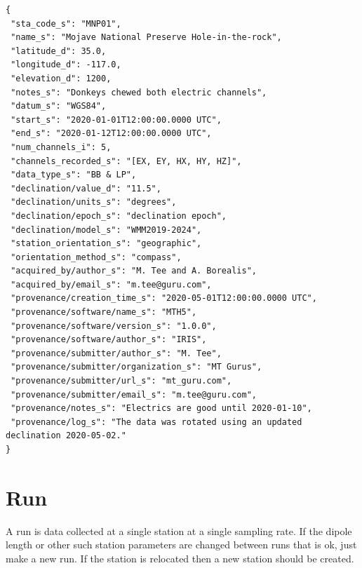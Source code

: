 \documentclass{article}
\begin{document}
\begin{verbatim}
{
 "sta_code_s": "MNP01",
 "name_s": "Mojave National Preserve Hole-in-the-rock",
 "latitude_d": 35.0,
 "longitude_d": -117.0,
 "elevation_d": 1200,
 "notes_s": "Donkeys chewed both electric channels",
 "datum_s": "WGS84",
 "start_s": "2020-01-01T12:00:00.0000 UTC",
 "end_s": "2020-01-12T12:00:00.0000 UTC",
 "num_channels_i": 5,
 "channels_recorded_s": "[EX, EY, HX, HY, HZ]",
 "data_type_s": "BB & LP",
 "declination/value_d": "11.5",
 "declination/units_s": "degrees",
 "declination/epoch_s": "declination epoch",
 "declination/model_s": "WMM2019-2024",
 "station_orientation_s": "geographic",
 "orientation_method_s": "compass",
 "acquired_by/author_s": "M. Tee and A. Borealis",
 "acquired_by/email_s": "m.tee@guru.com",
 "provenance/creation_time_s": "2020-05-01T12:00:00.0000 UTC",
 "provenance/software/name_s": "MTH5",
 "provenance/software/version_s": "1.0.0",
 "provenance/software/author_s": "IRIS",
 "provenance/submitter/author_s": "M. Tee",
 "provenance/submitter/organization_s": "MT Gurus",
 "provenance/submitter/url_s": "mt_guru.com",
 "provenance/submitter/email_s": "m.tee@guru.com",
 "provenance/notes_s": "Electrics are good until 2020-01-10",
 "provenance/log_s": "The data was rotated using an updated declination 2020-05-02."
}
\end{verbatim}

\newpage
\section{Run}

A run is data collected at a single station at a single sampling rate.  If the dipole length or other such station parameters are changed between runs that is ok, just make a new run.  If the station is relocated then a new station should be created.
\end{document}
